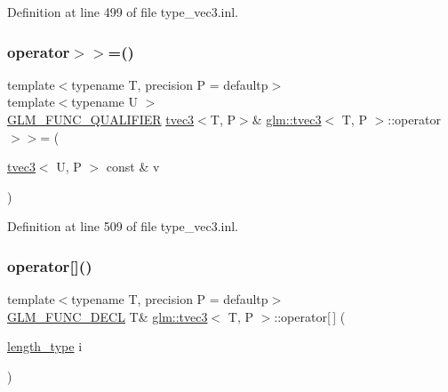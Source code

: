 Definition at line 499 of file type\+\_\+vec3.\+inl.

\mbox{\label{structglm_1_1tvec3_adfdb21940170dce288bebfff52613ebc}} 
\subsubsection{\texorpdfstring{operator$>$$>$=()}{operator>>=()}\hspace{0.1cm}{\footnotesize\ttfamily [6/6]}}
{\footnotesize\ttfamily template$<$typename T, precision P = defaultp$>$ \\
template$<$typename U $>$ \\
\mbox{\hyperlink{setup_8hpp_a33fdea6f91c5f834105f7415e2a64407}{G\+L\+M\+\_\+\+F\+U\+N\+C\+\_\+\+Q\+U\+A\+L\+I\+F\+I\+ER}} \mbox{\hyperlink{structglm_1_1tvec3}{tvec3}}$<$T, P$>$\& \mbox{\hyperlink{structglm_1_1tvec3}{glm\+::tvec3}}$<$ T, P $>$\+::operator$>$$>$= (\begin{DoxyParamCaption}\item[{\mbox{\hyperlink{structglm_1_1tvec3}{tvec3}}$<$ U, P $>$ const \&}]{v }\end{DoxyParamCaption})}



Definition at line 509 of file type\+\_\+vec3.\+inl.

\mbox{\label{structglm_1_1tvec3_ae58fbe8fe435bdd4c928aa08442e7284}} 
\subsubsection{\texorpdfstring{operator[]()}{operator[]()}\hspace{0.1cm}{\footnotesize\ttfamily [1/2]}}
{\footnotesize\ttfamily template$<$typename T, precision P = defaultp$>$ \\
\mbox{\hyperlink{setup_8hpp_ab2d052de21a70539923e9bcbf6e83a51}{G\+L\+M\+\_\+\+F\+U\+N\+C\+\_\+\+D\+E\+CL}} T\& \mbox{\hyperlink{structglm_1_1tvec3}{glm\+::tvec3}}$<$ T, P $>$\+::operator\mbox{[}$\,$\mbox{]} (\begin{DoxyParamCaption}\item[{\mbox{\hyperlink{structglm_1_1tvec3_a3a79c6a1cfc9fb8821a0a878fa2de91a}{length\+\_\+type}}}]{i }\end{DoxyParamCaption})}

